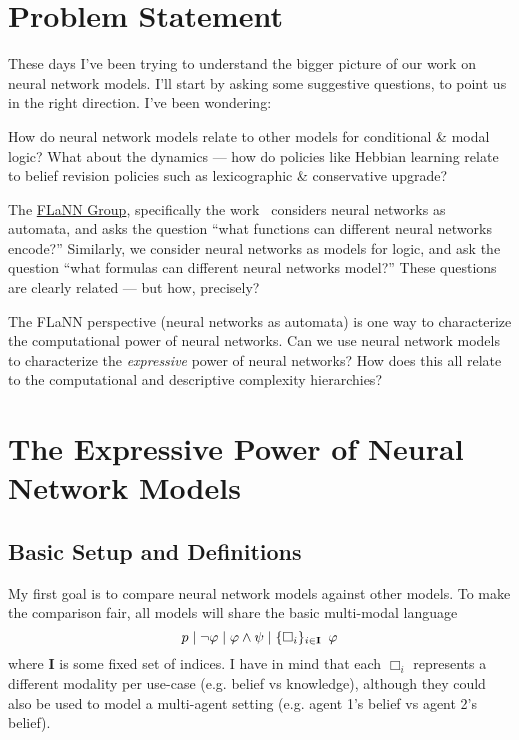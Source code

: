 \documentclass[letterpaper]{article}
\begin{document}
\section*{Problem Statement}

These days I've been trying to understand the bigger picture of our work on neural network models.  I'll start by asking some suggestive questions, to point us in the right direction. I've been wondering:

\begin{question}
    How do neural network models relate to other models for conditional \& modal logic?  What about the dynamics --- how do policies like Hebbian learning relate to belief revision policies such as lexicographic \& conservative upgrade?
\end{question}

\begin{question}
    The \href{http://flann.super.site/}{FLaNN Group}, specifically the work~\cite{merrill2019sequential,merrill2020formal,merrill2023expressive,strobl2024formal} considers neural networks as automata, and asks the question ``what functions can different neural networks encode?''  Similarly, we consider neural networks as models for logic, and ask the question ``what formulas can different neural networks model?''  These questions are clearly related --- but how, precisely?
\end{question}

\begin{question}
    The FLaNN perspective (neural networks as automata) is one way to characterize the computational power of neural networks.  Can we use neural network models to characterize the \emph{expressive} power of neural networks?  How does this all relate to the computational and descriptive complexity hierarchies?
\end{question}

\section*{The Expressive Power of Neural Network Models}

\subsection*{Basic Setup and Definitions}

My first goal is to compare neural network models against other models.  To make the comparison fair, all models will share the basic multi-modal language
\[
    p \mid \neg \varphi \mid \varphi \land \psi \mid \{ \Box_i \}_{i \in \textbf{I}} \hspace*{0.5em} \varphi
\]
where \textbf{I} is some fixed set of indices.  I have in mind that each $\Box_i$ represents a different modality per use-case (e.g. belief vs knowledge), although they could also be used to model a multi-agent setting (e.g. agent 1's belief vs agent 2's belief).
\end{document}
